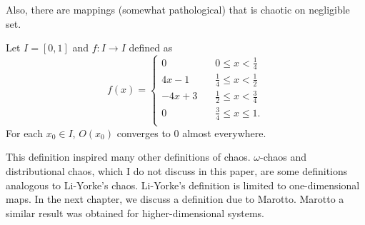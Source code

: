 \documentclass[12pt,draft,twoside]{book}
\begin{document}
Also, there are mappings  (somewhat pathological) that is chaotic on negligible set.
\begin{proposition}
  Let $I = [0,1]$ and $f: I \to I$ defined as
  \begin{equation*}
    f(x) =
    \begin{cases}
      0 \quad & 0\leq x < \frac{1}{4} \\
      4x - 1 \quad  & \frac{1}{4} \leq x < \frac{1}{2} \\
      -4x + 3 \quad & \frac{1}{2} \leq x < \frac{3}{4} \\
      0 \quad & \frac{3}{4} \leq x \leq 1. \\
    \end{cases}
  \end{equation*}
  For each $x_0 \in I$, $O(x_0)$ converges to 0 almost everywhere.
\end{proposition}

This definition inspired many other definitions of chaos.
$\omega$-chaos and distributional chaos, which I do not discuss in this paper, are some definitions analogous to Li-Yorke's chaos.
Li-Yorke's definition is limited to one-dimensional maps.
In the next chapter, we discuss a definition due to Marotto.
Marotto a similar result was obtained for higher-dimensional systems.




\printindex
\end{document}
